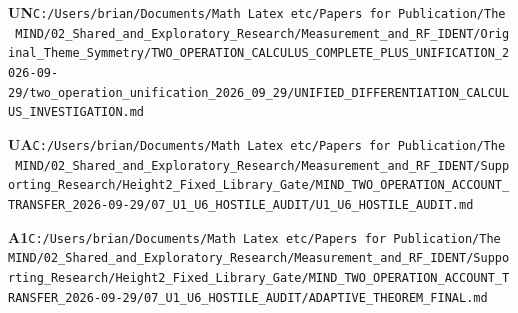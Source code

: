 \documentclass[10pt,letterpaper]{article}
\begin{document}
\noindent\textbf{UN}\quad \texttt{C:/\allowbreak{}Users/\allowbreak{}brian/\allowbreak{}Documents/\allowbreak{}Math\ Latex\ etc/\allowbreak{}Papers\ for\ Publication/\allowbreak{}The\ MIND/\allowbreak{}02\_\allowbreak{}Shared\_\allowbreak{}and\_\allowbreak{}Exploratory\_\allowbreak{}Research/\allowbreak{}Measurement\_\allowbreak{}and\_\allowbreak{}RF\_\allowbreak{}IDENT/\allowbreak{}Original\_\allowbreak{}Theme\_\allowbreak{}Symmetry/\allowbreak{}TWO\_\allowbreak{}OPERATION\_\allowbreak{}CALCULUS\_\allowbreak{}COMPLETE\_\allowbreak{}PLUS\_\allowbreak{}UNIFICATION\_\allowbreak{}2026-\allowbreak{}09-\allowbreak{}29/\allowbreak{}two\_\allowbreak{}operation\_\allowbreak{}unification\_\allowbreak{}2026\_\allowbreak{}09\_\allowbreak{}29/\allowbreak{}UNIFIED\_\allowbreak{}DIFFERENTIATION\_\allowbreak{}CALCULUS\_\allowbreak{}INVESTIGATION.md}\par
\noindent\textbf{UA}\quad \texttt{C:/\allowbreak{}Users/\allowbreak{}brian/\allowbreak{}Documents/\allowbreak{}Math\ Latex\ etc/\allowbreak{}Papers\ for\ Publication/\allowbreak{}The\ MIND/\allowbreak{}02\_\allowbreak{}Shared\_\allowbreak{}and\_\allowbreak{}Exploratory\_\allowbreak{}Research/\allowbreak{}Measurement\_\allowbreak{}and\_\allowbreak{}RF\_\allowbreak{}IDENT/\allowbreak{}Supporting\_\allowbreak{}Research/\allowbreak{}Height2\_\allowbreak{}Fixed\_\allowbreak{}Library\_\allowbreak{}Gate/\allowbreak{}MIND\_\allowbreak{}TWO\_\allowbreak{}OPERATION\_\allowbreak{}ACCOUNT\_\allowbreak{}TRANSFER\_\allowbreak{}2026-\allowbreak{}09-\allowbreak{}29/\allowbreak{}07\_\allowbreak{}U1\_\allowbreak{}U6\_\allowbreak{}HOSTILE\_\allowbreak{}AUDIT/\allowbreak{}U1\_\allowbreak{}U6\_\allowbreak{}HOSTILE\_\allowbreak{}AUDIT.md}\par
\noindent\textbf{A1}\quad \texttt{C:/\allowbreak{}Users/\allowbreak{}brian/\allowbreak{}Documents/\allowbreak{}Math\ Latex\ etc/\allowbreak{}Papers\ for\ Publication/\allowbreak{}The\ MIND/\allowbreak{}02\_\allowbreak{}Shared\_\allowbreak{}and\_\allowbreak{}Exploratory\_\allowbreak{}Research/\allowbreak{}Measurement\_\allowbreak{}and\_\allowbreak{}RF\_\allowbreak{}IDENT/\allowbreak{}Supporting\_\allowbreak{}Research/\allowbreak{}Height2\_\allowbreak{}Fixed\_\allowbreak{}Library\_\allowbreak{}Gate/\allowbreak{}MIND\_\allowbreak{}TWO\_\allowbreak{}OPERATION\_\allowbreak{}ACCOUNT\_\allowbreak{}TRANSFER\_\allowbreak{}2026-\allowbreak{}09-\allowbreak{}29/\allowbreak{}07\_\allowbreak{}U1\_\allowbreak{}U6\_\allowbreak{}HOSTILE\_\allowbreak{}AUDIT/\allowbreak{}ADAPTIVE\_\allowbreak{}THEOREM\_\allowbreak{}FINAL.md}\par
\end{document}

